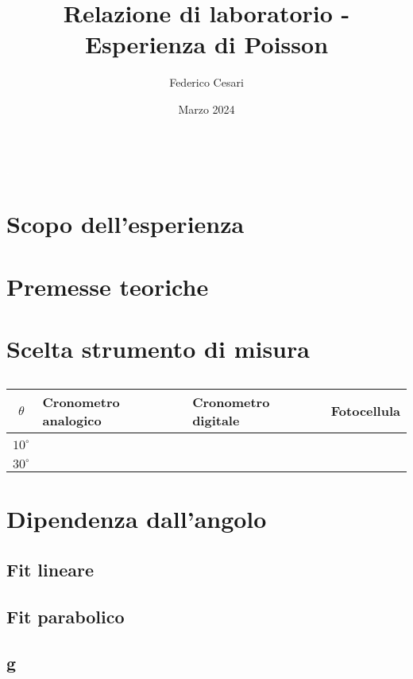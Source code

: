 \documentclass{article}
\title{Relazione di laboratorio - Esperienza di Poisson}
\author{Federico Cesari}
\date{Marzo 2024}
\begin{document}

\tableofcontents

\newpage
\textcolor{white}{.}
\vfill


\section{Scopo dell’esperienza}

\section{Premesse teoriche}

\section{Scelta strumento di misura}

\begin{table}[]
	\centering
	\begin{tabular}{@{}clll@{}}
		\toprule
		\rowcolor[HTML]{68CBD0} 
		\textbf{$\theta$}            & \textbf{Cronometro analogico} & \textbf{Cronometro digitale} & \textbf{Fotocellula} \\ \midrule
		&                               &                              &                      \\ \cmidrule(l){2-4} 
		\multirow{-2}{*}{$10^\circ$} &                               &                              &                      \\ \midrule
		&                               &                              &                      \\ \cmidrule(l){2-4} 
		\multirow{-2}{*}{$30^\circ$} &                               &                              &                      \\ \bottomrule
	\end{tabular}
	\caption{}
	\label{tab:my-table}
\end{table}


\section{Dipendenza dall’angolo}
\subsection{Fit lineare}
\subsection{Fit parabolico}
\subsection{g}
\end{document}
